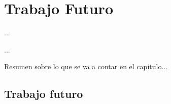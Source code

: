
%
%

\chapter{Trabajo Futuro}

\begin{FraseCelebre}
\begin{Frase}
...
\end{Frase}
\begin{Fuente}
...
\end{Fuente}
\end{FraseCelebre}

\begin{resumen}
Resumen sobre lo que se va a contar en el capitulo...
\end{resumen}


\section{Trabajo futuro}
\label{cap34:sec:futuro}

\section*{\ProximoCapitulo}
\TocProximoCapitulo








